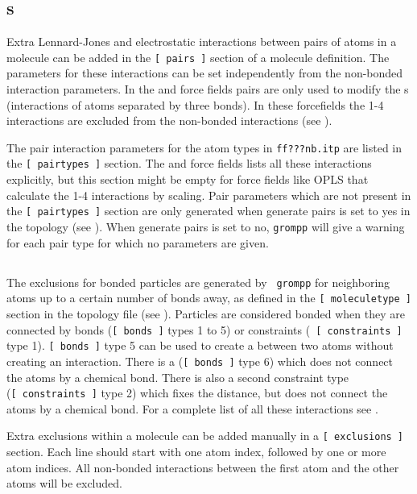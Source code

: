 \subsection{s}
Extra Lennard-Jones and electrostatic interactions between pairs
of atoms in a molecule can be added in the {\tt [~pairs~]} section of
a molecule definition. The parameters for these interactions can
be set independently from the non-bonded interaction parameters.
In the {\gromacs} and {\gromos} force fields pairs are only used
to modify the s (interactions of atoms
separated by three bonds). In these forcefields the 1-4 interactions
are excluded from the non-bonded interactions (see ).

The pair interaction parameters for the atom types
in {\tt ff???nb.itp} are listed in the {\tt [~pairtypes~]} section.
The {\gromacs} and {\gromos} force fields lists all these interactions 
explicitly, but this section might be empty for force fields like
OPLS that calculate the 1-4 interactions by scaling.
Pair parameters which are not present in the {\tt [~pairtypes~]} section
are only generated when generate pairs is set to yes in the topology
(see ). When generate pairs is set to no, {\tt grompp}
will give a warning for each pair type for which no parameters are given.

\subsection{}
\label{subsec:excl}
The exclusions for bonded particles are generated by {\tt
grompp} for neighboring atoms up to a certain number of bonds away, as
defined in the {\tt [~moleculetype~]} section in the topology file
(see ). Particles are considered bonded when they are
connected by bonds ({\tt [~bonds~]} types 1 to 5) or constraints ({\tt
[~constraints~]} type 1).
{\tt[~bonds~]} type 5 can be used to create a 
between two atoms without creating an interaction.
There is a 
({\tt[~bonds~]} type 6) which does not connect the atoms by a chemical bond.
There is also a second constraint type ({\tt[~constraints~]} type 2)
which fixes the distance, but does not connect
the atoms by a chemical bond.
For a complete list of all these interactions see .

Extra exclusions within a molecule can be added manually
in a {\tt [~exclusions~]} section. Each line should start with one
atom index, followed by one or more atom indices. All non-bonded
interactions between the first atom and the other atoms will be excluded.

